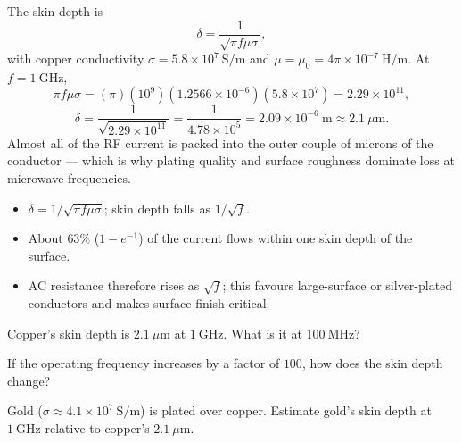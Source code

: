 \begin{workedexample}
The skin depth is
\[ \delta = \frac{1}{\sqrt{\pi f \mu \sigma}}, \]
with copper conductivity $\sigma = 5.8\times10^{7}\ \mathrm{S/m}$ and
$\mu = \mu_0 = 4\pi\times10^{-7}\ \mathrm{H/m}$. At $f = 1\ \mathrm{GHz}$,
\[ \pi f \mu \sigma = (\pi)(10^{9})(1.2566\times10^{-6})(5.8\times10^{7}) = 2.29\times10^{11}, \]
\[ \delta = \frac{1}{\sqrt{2.29\times10^{11}}} = \frac{1}{4.78\times10^{5}} = 2.09\times10^{-6}\ \mathrm{m} \approx 2.1\ \mu\mathrm{m}. \]
Almost all of the RF current is packed into the outer couple of microns of the
conductor --- which is why plating quality and surface roughness dominate loss at
microwave frequencies.
\end{workedexample}

\begin{keytakeaways}
\begin{itemize}[leftmargin=1.4em,itemsep=2pt]
\item $\delta = 1/\sqrt{\pi f \mu \sigma}$; skin depth falls as $1/\sqrt{f}$.
\item About $63\%$ ($1-e^{-1}$) of the current flows within one skin depth of the surface.
\item AC resistance therefore rises as $\sqrt{f}$; this favours large-surface or
silver-plated conductors and makes surface finish critical.
\end{itemize}
\end{keytakeaways}

\begin{exercises}
\item Copper's skin depth is $2.1\ \mu\mathrm{m}$ at $1\ \mathrm{GHz}$. What is it at $100\ \mathrm{MHz}$?
\item If the operating frequency increases by a factor of $100$, how does the skin depth change?
\item Gold ($\sigma \approx 4.1\times10^{7}\ \mathrm{S/m}$) is plated over copper.
Estimate gold's skin depth at $1\ \mathrm{GHz}$ relative to copper's $2.1\ \mu\mathrm{m}$.
\end{exercises}

